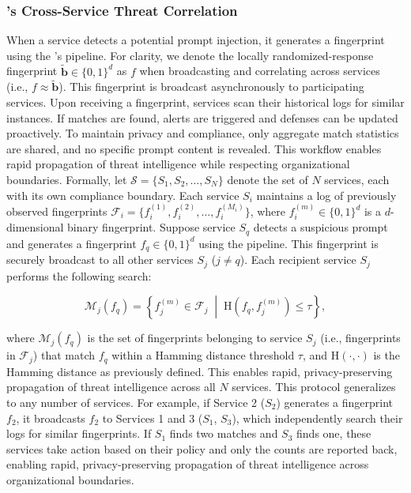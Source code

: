 \subsubsection{\tool's Cross-Service Threat Correlation}
When a service detects a potential prompt injection, it generates a fingerprint using the \tool's pipeline.
For clarity, we denote the locally randomized-response fingerprint $\tilde{\mathbf b}\in\{0,1\}^d$ as $f$ when broadcasting and correlating across services (i.e., $f\approx \tilde{\mathbf b}$).
This fingerprint is broadcast asynchronously to participating services.
Upon receiving a fingerprint, services scan their historical logs for similar instances.
If matches are found, alerts are triggered and defenses can be updated proactively.
To maintain privacy and compliance, only aggregate match statistics are shared, and no specific prompt content is revealed.
This workflow enables rapid propagation of threat intelligence while respecting organizational boundaries.
Formally, let $\mathcal{S} = \{S_1, S_2, \ldots, S_N\}$ denote the set of $N$ services, each with its own compliance boundary.
Each service $S_i$ maintains a log of previously observed fingerprints $\mathcal{F}_i = \{f_i^{(1)}, f_i^{(2)}, \ldots, f_i^{(M_i)}\}$, where $f_i^{(m)} \in \{0,1\}^d$ is a $d$-dimensional binary fingerprint.
Suppose service $S_q$ detects a suspicious prompt and generates a fingerprint $f_q \in \{0,1\}^d$ using the \tool pipeline.
This fingerprint is securely broadcast to all other services $S_j$ ($j \neq q$).
Each recipient service $S_j$ performs the following search:

\[
    \mathcal{M}_j(f_q) = \left\{ f_j^{(m)} \in \mathcal{F}_j \;\middle|\; \mathrm{H}(f_q, f_j^{(m)}) \leq \tau \right\} ,
\]

where $\mathcal{M}_j(f_q)$ is the set of fingerprints belonging to service $S_j$ (i.e., fingerprints in $\mathcal{F}_j$) that match $f_q$ within a Hamming distance threshold $\tau$, and $\mathrm{H}(\cdot, \cdot)$ is the Hamming distance as previously defined.
%
This enables rapid, privacy-preserving propagation of threat intelligence across all $N$ services.
This protocol generalizes to any number of services.
For example, if Service 2 ($S_2$) generates a fingerprint $f_2$, it broadcasts $f_2$ to Services 1 and 3 ($S_1$, $S_3$), which independently search their logs for similar fingerprints.
If $S_1$ finds two matches and $S_3$ finds one, these services take action based on their policy and only the counts are reported back, enabling rapid, privacy-preserving propagation of threat intelligence across organizational boundaries.



